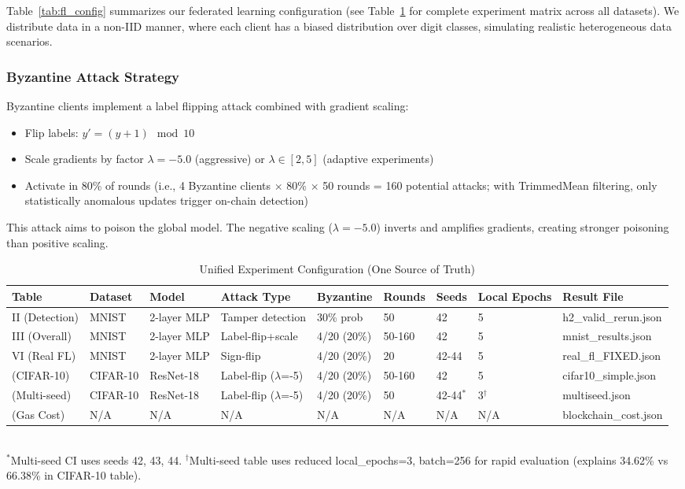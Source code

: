 \documentclass{ieeeaccess}
\begin{document}
Table~\ref{tab:fl_config} summarizes our federated learning configuration (see Table~\ref{tab:experiment_config} for complete experiment matrix across all datasets). We distribute data in a non-IID manner, where each client has a biased distribution over digit classes, simulating realistic heterogeneous data scenarios.

\subsubsection{Byzantine Attack Strategy}

Byzantine clients implement a label flipping attack combined with gradient scaling:
\begin{itemize}
    \item Flip labels: $y' = (y + 1) \mod 10$
    \item Scale gradients by factor $\lambda = -5.0$ (aggressive) or $\lambda \in [2, 5]$ (adaptive experiments)
    \item Activate in 80\% of rounds (i.e., 4 Byzantine clients $\times$ 80\% $\times$ 50 rounds = 160 potential attacks; with TrimmedMean filtering, only statistically anomalous updates trigger on-chain detection)
\end{itemize}

This attack aims to poison the global model. The negative scaling ($\lambda=-5.0$) inverts and amplifies gradients, creating stronger poisoning than positive scaling.

\begin{table}[t]
\caption{Unified Experiment Configuration (One Source of Truth)}
\label{tab:experiment_config}
\centering
\small
\begin{tabular}{p{1.8cm}p{1.5cm}p{1.2cm}p{2.3cm}p{1.5cm}p{1cm}p{1cm}p{1.5cm}p{2cm}}
\toprule
\textbf{Table} & \textbf{Dataset} & \textbf{Model} & \textbf{Attack Type} & \textbf{Byzantine} & \textbf{Rounds} & \textbf{Seeds} & \textbf{Local Epochs} & \textbf{Result File} \\
\midrule
II (Detection) & MNIST & 2-layer MLP & Tamper detection & 30\% prob & 50 & 42 & 5 & h2\_valid\_rerun.json \\
III (Overall) & MNIST & 2-layer MLP & Label-flip+scale & 4/20 (20\%) & 50-160 & 42 & 5 & mnist\_results.json \\
VI (Real FL) & MNIST & 2-layer MLP & Sign-flip & 4/20 (20\%) & 20 & 42-44 & 5 & real\_fl\_FIXED.json \\
(CIFAR-10) & CIFAR-10 & ResNet-18 & Label-flip ($\lambda$=-5) & 4/20 (20\%) & 50-160 & 42 & 5 & cifar10\_simple.json \\
(Multi-seed) & CIFAR-10 & ResNet-18 & Label-flip ($\lambda$=-5) & 4/20 (20\%) & 50 & 42-44$^*$ & 3$^\dagger$ & multiseed.json \\
(Gas Cost) & N/A & N/A & N/A & N/A & N/A & N/A & N/A & blockchain\_cost.json \\
\bottomrule
\end{tabular}
\\[0.1cm]
\small $^*$Multi-seed CI uses seeds 42, 43, 44. $^\dagger$Multi-seed table uses reduced local\_epochs=3, batch=256 for rapid evaluation (explains 34.62\% vs 66.38\% in CIFAR-10 table).
\end{table}
\end{document}
